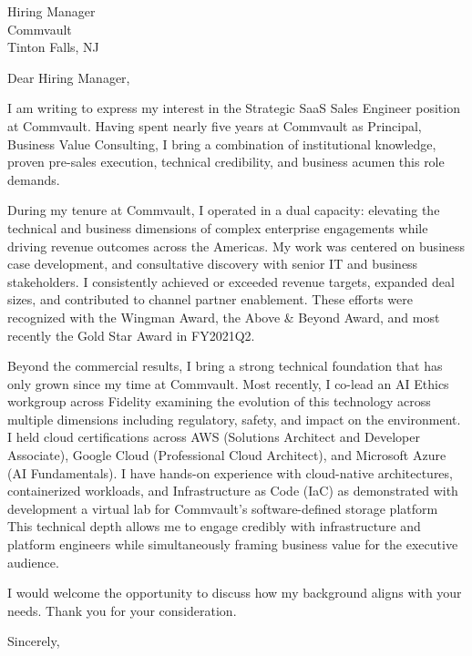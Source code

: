 \documentclass[11pt]{letter}
\date{15 May 2026}
\begin{document}
\begin{letter}{Hiring Manager \\ Commvault \\ Tinton Falls, NJ}

\opening{Dear Hiring Manager,}

I am writing to express my interest in the Strategic SaaS Sales Engineer position at Commvault. Having spent nearly five years at Commvault as Principal, Business Value Consulting, I bring a combination of institutional knowledge, proven pre-sales execution, technical credibility, and business acumen this role demands.

During my tenure at Commvault, I operated in a dual capacity: elevating the technical and business dimensions of complex enterprise engagements while driving revenue outcomes across the Americas. My work was centered on business case development, and consultative discovery with senior IT and business stakeholders. I consistently achieved or exceeded revenue targets, expanded deal sizes, and contributed to channel partner enablement. These efforts were recognized with the Wingman Award, the Above \& Beyond Award, and most recently the Gold Star Award in FY2021Q2.

Beyond the commercial results, I bring a strong technical foundation that has only grown since my time at Commvault. Most recently, I co-lead an AI Ethics workgroup across Fidelity examining the evolution of this technology across multiple dimensions including regulatory, safety, and impact on the environment. I held cloud certifications across AWS (Solutions Architect and Developer Associate), Google Cloud (Professional Cloud Architect), and Microsoft Azure (AI Fundamentals). I have hands-on experience with cloud-native architectures, containerized workloads, and Infrastructure as Code (IaC) as demonstrated with development a virtual lab for Commvault's software-defined storage platform This technical depth allows me to engage credibly with infrastructure and platform engineers while simultaneously framing business value for the executive audience.

I would welcome the opportunity to discuss how my background aligns with your needs. Thank you for your consideration.

\closing{Sincerely,}

\end{letter}
\end{document}
